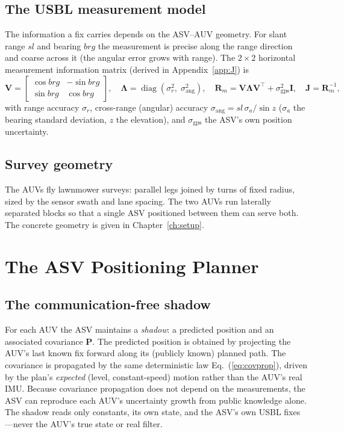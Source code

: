 \documentclass[12pt,a4paper,oneside]{book}
\newcommand{\eqnref}[1]{Eq.~(\ref{#1})}
\newcommand{\chapref}[1]{Chapter~\ref{#1}}
\begin{document}
\section{The USBL measurement model}
\label{sec:usblmodel}
The information a fix carries depends on the ASV--AUV geometry. For slant range $sl$ and bearing $brg$ the
measurement is precise along the range direction and coarse across it (the angular error grows with range).
The $2\times2$ horizontal measurement information matrix (derived in Appendix~\ref{app:J}) is
\begin{equation}
\mathbf{V}=\begin{bmatrix}\cos brg & -\sin brg\\ \sin brg & \cos brg\end{bmatrix},\quad
\boldsymbol{\Lambda}=\operatorname{diag}(\sigma_r^2,\;\sigma_{\text{ang}}^2),\quad
\mathbf{R}_m=\mathbf{V}\boldsymbol{\Lambda}\mathbf{V}^{\!\top}+\sigma_{\text{gps}}^2\mathbf{I},\quad
\mathbf{J}=\mathbf{R}_m^{-1},
\label{eq:jmeas}
\end{equation}
with range accuracy $\sigma_r$, cross-range (angular) accuracy $\sigma_{\text{ang}}=sl\,\sigma_a/\sin z$
($\sigma_a$ the bearing standard deviation, $z$ the elevation), and $\sigma_{\text{gps}}$ the ASV's own
position uncertainty.

\section{Survey geometry}
The AUVs fly lawnmower surveys: parallel legs joined by turns of fixed radius, sized by the sensor swath and
lane spacing. The two AUVs run laterally separated blocks so that a single ASV positioned between them can
serve both. The concrete geometry is given in \chapref{ch:setup}.

\chapter{The ASV Positioning Planner}
\label{ch:planner}

\section{The communication-free shadow}
\label{sec:shadow}
For each AUV the ASV maintains a \emph{shadow}: a predicted position and an associated covariance
$\mathbf{P}$. The predicted position is obtained by projecting the AUV's last known fix forward along its
(publicly known) planned path. The covariance is propagated by the same deterministic law
\eqnref{eq:covprop}, driven by the plan's \emph{expected} (level, constant-speed) motion rather than the
AUV's real IMU. Because covariance propagation does not depend on the measurements, the ASV can reproduce
each AUV's uncertainty growth from public knowledge alone. The shadow reads only constants, its own state,
and the ASV's own USBL fixes---never the AUV's true state or real filter.
\end{document}
